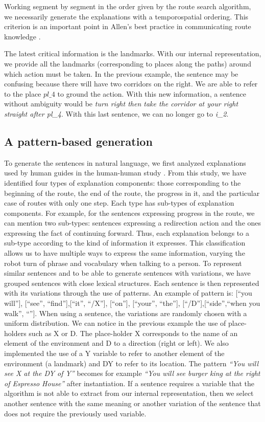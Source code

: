 Working segment by segment in the order given by the route search algorithm, we necessarily generate the explanations with a temporospatial ordering. This criterion is an important point in Allen's best practice in communicating route knowledge \cite{allen_2000_principles}.

The latest critical information is the landmarks. With our internal representation, we provide all the landmarks (corresponding to places along the paths) around which action must be taken. In the previous example, the sentence may be confusing because there will have two corridors on the right. We are able to refer to the place $pl\_4$ to ground the action. With this new information, a sentence without ambiguity would be \textit{turn right then take the corridor at your right straight after pl\_4}. With this last sentence, we can no longer go to \textit{i\_2}.

\subsection{A pattern-based generation}

To generate the sentences in natural language, we first analyzed explanations used by human guides in the human-human study \cite{belhassein_2017_human}. From this study, we have identified four types of explanation components: those corresponding to the beginning of the route, the end of the route, the progress in it, and the particular case of routes with only one step. Each type has sub-types of explanation components. For example, for the sentences expressing progress in the route, we can mention two sub-types: sentences expressing a redirection action and the ones expressing the fact of continuing forward. Thus, each explanation belongs to a sub-type according to the kind of information it expresses. This classification allows us to have multiple ways to express the same information, varying the robot turn of phrase and vocabulary when talking to a person. To represent similar sentences and to be able to generate sentences with variations, we have grouped sentences with close lexical structures. Each sentence is then represented with its variations through the use of patterns. An example of pattern is: [``you will''], [``see'', ``find''],[``it'', ``/X''], [``on''], [``your'', ``the''], [``/D''],[``side'',``when you walk'', ``'']. When using a sentence, the variations are randomly chosen with a uniform distribution. We can notice in the previous example the use of place-holders such as X or D. The place-holder X corresponds to the name of an element of the environment and D to a direction (right or left). We also implemented the use of a Y variable to refer to another element of the environment (a landmark) and DY to refer to its location. The pattern \textit{``You will see X at the DY of Y''}  becomes for example \textit{``You will see burger king at the right of Espresso House''} after instantiation. If a sentence requires a variable that the algorithm is not able to extract from our internal representation, then we select another sentence with the same meaning or another variation of the sentence that does not require the previously used variable.


